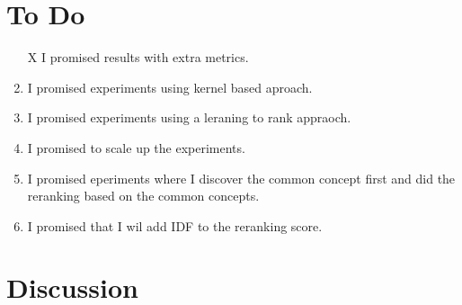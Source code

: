 \documentclass{article}
\renewcommand{\bullet}[0]{$\blacktriangleright$}
\begin{document}

\section{To Do}
\label{sec:todo}
\begin{enumerate}
\item [X] I promised results with extra metrics.
\item I promised experiments using kernel based aproach.
\item I promised experiments using a leraning to rank appraoch.
\item I promised to scale up the experiments.
\item I promised eperiments where I discover the common concept first and did
  the reranking based on the common concepts.
\item I promised that I wil add IDF to the reranking score.
\end{enumerate}


\section{Discussion}
\label{sec:discussion}



\end{document}
